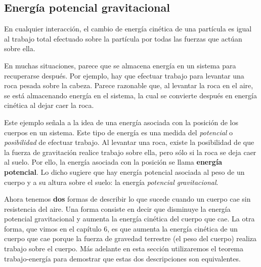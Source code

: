 \documentclass{article}
\newcommand{\newsubsection}[1]{
    \vspace{0.5cm}
    \color{sectionColor}
    \subsection{\bl{#1}}
    \color{black}
    \vspace{0.5cm}
}
\newcommand{\bl}[1]{\textbf{#1}}
\begin{document}
    \newsubsection{Energía potencial gravitacional}

    \par En cualquier interacción, el cambio de energía cinética de una partícula es igual al trabajo total efectuado sobre la partícula por todas las fuerzas que actúan sobre ella.

    \par En muchas situaciones, parece que se almacena energía en un sistema para recuperarse después. Por ejemplo, hay que efectuar trabajo para levantar una roca pesada sobre la cabeza. Parece razonable que, al levantar la roca en el aire, se está almacenando energía en el sistema, la cual se convierte después en energía cinética al dejar caer la roca.

    \vspace{0.5cm}

    \par Este ejemplo señala a la idea de una energía asociada con la posición de los cuerpos en un sistema. Este tipo de energía es una medida del \textit{potencial} o \textit{posibilidad} de efectuar trabajo. Al levantar una roca, existe la posibilidad de que la fuerza de gravitación realice trabajo sobre ella, pero sólo si la roca se deja caer al suelo. Por ello, la energía asociada con la posición se llama \bl{energía potencial}. Lo dicho sugiere que hay energía potencial asociada al peso de un cuerpo y a su altura sobre el suelo: la energía \textit{potencial gravitacional}.

    \par Ahora tenemos \bl{dos} formas de describir lo que sucede cuando un cuerpo cae sin resistencia del aire. Una forma consiste en decir que disminuye la energía potencial gravitacional y aumenta la energía cinética del cuerpo que cae. La otra forma, que vimos en el capítulo 6, es que aumenta la energía cinética de un cuerpo que cae porque la fuerza de gravedad terrestre (el peso del cuerpo) realiza trabajo sobre el cuerpo. Más adelante en esta sección utilizaremos el teorema trabajo-energía para demostrar que estas dos descripciones son equivalentes.
\end{document}
